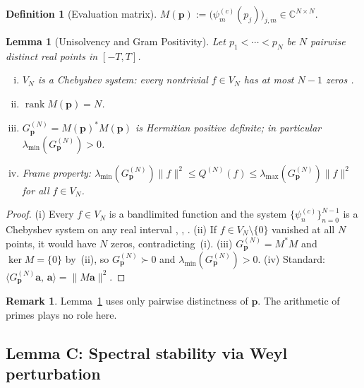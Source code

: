 \documentclass[12pt,a4paper]{amsart}
\newtheorem{lemma}[theorem]{Lemma}
\theoremstyle{definition}
\newtheorem{definition}[theorem]{Definition}
\newtheorem{remark}[theorem]{Remark}
\newcommand{\GVM}{G^{(N)}_{\mathbf{p}}}
\newcommand{\QM}{Q^{(N)}}
\newcommand{\psin}{\psi_n^{(c)}}
\newcommand{\norm}[1]{\|#1\|}
\newcommand{\ip}[2]{\langle #1,\, #2\rangle}
\begin{document}
\begin{definition}[Evaluation matrix]\label{def:evalmatrix}
$M(\mathbf{p}):=\bigl(\psi_m^{(c)}(p_j)\bigr)_{j,m}\in\mathbb{C}^{N\times N}$.
\end{definition}

\begin{lemma}[Unisolvency and Gram Positivity]\label{lem:B}
Let $p_1<\cdots<p_N$ be $N$ pairwise distinct real points in $[-T,T]$.
\begin{enumerate}[(i)]
\item $V_N$ is a Chebyshev system:\/ every nontrivial $f\in V_N$
has at most $N-1$ zeros \cite{KarlinStudden1966}.
\item $\operatorname{rank}M(\mathbf{p})=N$.
\item $\GVM=M(\mathbf{p})^*M(\mathbf{p})$ is Hermitian positive definite;
in particular $\lambda_{\min}(\GVM)>0$.
\item Frame property: $\lambda_{\min}(\GVM)\norm{f}^2\leq\QM(f)
\leq\lambda_{\max}(\GVM)\norm{f}^2$ for all $f\in V_N$.
\end{enumerate}
\end{lemma}

\begin{proof}
(i) Every $f\in V_N$ is a bandlimited function and the system
$\{\psin\}_{n=0}^{N-1}$ is a Chebyshev system on any real interval
\cite[\S\,II]{Slepian1978}, \cite[Cor.~1.3]{BonamiKaroui},
\cite[Ch.~1, Thm.~3.1]{KarlinStudden1966}.
(ii) If $f\in V_N\setminus\{0\}$ vanished at all $N$ points, it
would have $N$ zeros, contradicting~(i).
(iii) $\GVM=M^*M$ and $\ker M=\{0\}$ by~(ii), so $\GVM\succ0$
and $\lambda_{\min}(\GVM)>0$.
(iv) Standard: $\ip{\GVM\mathbf{a}}{\mathbf{a}}=\norm{M\mathbf{a}}^2$.
\end{proof}

\begin{remark}\label{rem:primes_B}
Lemma~\ref{lem:B} uses only pairwise distinctness of $\mathbf{p}$.
The arithmetic of primes plays no role here.
\end{remark}

\subsection{Lemma C: Spectral stability via Weyl perturbation}
\end{document}
